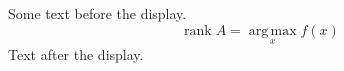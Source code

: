 \documentclass[12pt]{article}
\begin{document}
Some text before the display.
\[ \operatorname{rank} A = \operatorname*{arg\,max}_x f(x) \]
Text after the display.
\end{document}

